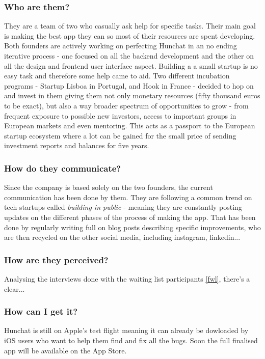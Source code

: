 \documentclass[12pt]{article}
\begin{document}
	\subsubsection{Who are them?}
They are a team of two who casually ask help for specific tasks. Their main goal is making the best app they can so most of their resources are spent developing. Both founders are actively working on perfecting Hunchat in an no ending iterative process - one focused on all the backend development and the other on all the design and frontend user interface aspect. Building a a small startup is no easy task and therefore some help came to aid. Two different incubation programs - Startup Lisboa in Portugal, and Hook in France - decided to hop on and invest in them giving them not only monetary resources (fifty thousand euros to be exact), but also a way broader spectrum of opportunities to grow - from frequent exposure to possible new investors, access to important groups in European markets and even mentoring. This acts as a passport to the European startup ecosystem where a lot can be gained for the small price of sending investment reports and balances for five years.

	\subsubsection{How do they communicate?}
Since the company is based solely on the two founders, the current communication has been done by them. They are following a common trend on tech startups called \textit{building in public} - meaning they are constantly posting updates on the different phases of the process of making the app. That has been done by regularly writing full on blog posts describing specific improvements, who are then recycled on the other social media, including instagram, linkedin...

	\subsubsection{How are they perceived?}
Analysing the interviews done with the waiting list participants \ref{fwl}, there's a clear...

	\subsubsection{How can I get it?}
Hunchat is still on Apple's test flight meaning it can already be dowloaded by iOS users who want to help them find and fix all the bugs. Soon the full finalised app will be available on the App Store.
\end{document}
